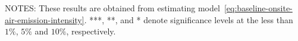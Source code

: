 \begin{table}[H]
{\begin{tabular}{@{}lllllllllllll@{}}
        \end{tabular}%
    }
    \begin{minipage}{\columnwidth}
        \vspace{0.05in}
        \tiny NOTES: These results are obtained from estimating model~\ref{eq:baseline-onsite-air-emission-intensity}. ***, **, and * denote significance levels at the less than $1\%$, $5\%$ and $10\%$, respectively.
    \end{minipage}
\end{table}